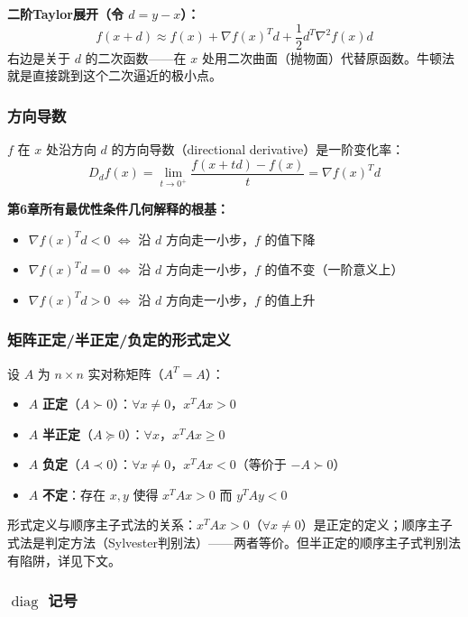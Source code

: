 \textbf{二阶Taylor展开（令 $d=y-x$）：}
\[
f(x+d) \approx f(x) + \nabla f(x)^T d + \frac{1}{2} d^T \nabla^2 f(x) d
\]
右边是关于 $d$ 的二次函数——在 $x$ 处用二次曲面（抛物面）代替原函数。牛顿法就是直接跳到这个二次逼近的极小点。

\subsubsection{方向导数}

$f$ 在 $x$ 处沿方向 $d$ 的方向导数（directional derivative）是一阶变化率：
\[
D_d f(x) = \lim_{t\to 0^+} \frac{f(x+td)-f(x)}{t} = \nabla f(x)^T d
\]

\textbf{第6章所有最优性条件几何解释的根基：}
\begin{itemize}
  \item $\nabla f(x)^T d < 0$ $\Longleftrightarrow$ 沿 $d$ 方向走一小步，$f$ 的值下降
  \item $\nabla f(x)^T d = 0$ $\Longleftrightarrow$ 沿 $d$ 方向走一小步，$f$ 的值不变（一阶意义上）
  \item $\nabla f(x)^T d > 0$ $\Longleftrightarrow$ 沿 $d$ 方向走一小步，$f$ 的值上升
\end{itemize}

\subsubsection{矩阵正定/半正定/负定的形式定义}

设 $A$ 为 $n\times n$ 实对称矩阵（$A^T=A$）：
\begin{itemize}
  \item $A$ \textbf{正定}（$A \succ 0$）：$\forall x\neq 0$，$x^T A x > 0$
  \item $A$ \textbf{半正定}（$A \succeq 0$）：$\forall x$，$x^T A x \ge 0$
  \item $A$ \textbf{负定}（$A \prec 0$）：$\forall x\neq 0$，$x^T A x < 0$（等价于 $-A \succ 0$）
  \item $A$ \textbf{不定}：存在 $x,y$ 使得 $x^T A x > 0$ 而 $y^T A y < 0$
\end{itemize}

形式定义与顺序主子式法的关系：$x^T A x > 0$（$\forall x\neq0$）是正定的定义；顺序主子式法是判定方法（Sylvester判别法）——两者等价。但半正定的顺序主子式判别法有陷阱，详见下文。

\subsubsection{$\operatorname{diag}$ 记号}

